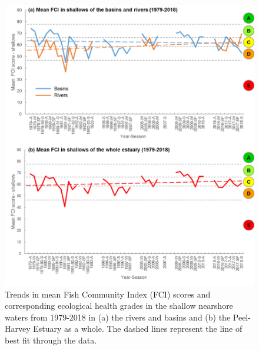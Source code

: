 \documentclass[
]{book}
\begin{document}
\begin{figure}
\includegraphics[width=0.95\linewidth]{images/fish_ecology/picture6} \caption{Trends in mean Fish Community Index (FCI) scores and corresponding ecological health grades in the shallow nearshore waters from 1979-2018 in (a) the rivers and basins and (b) the Peel-Harvey Estuary as a whole. The dashed lines represent the line of best fit through the data.}\label{fig:fish-ecology-pic6}
\end{figure}
\end{document}
